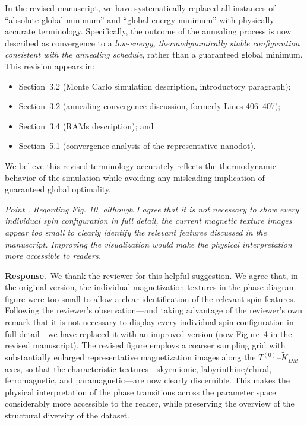 \documentclass[review,12pt]{report}
\newenvironment{reviewer}{\setcounter{pointcounter}{1}}{}
\newcommand{\point}[1]{\medskip \noindent
 \textsl{{\fontseries{b}\selectfont Point \thepointcounter}.
 \stepcounter{pointcounter} #1}}
\newcommand{\reply}{\medskip \noindent \textbf{Response}.\ }
\begin{document}
\begin{reviewer}
{In the revised manuscript, we have systematically replaced all instances of ``absolute global minimum'' and ``global energy minimum'' with physically accurate terminology. Specifically, the outcome of the annealing process is now described as convergence to a \emph{low-energy, thermodynamically stable configuration consistent with the annealing schedule}, rather than a guaranteed global minimum. This revision appears in:
\begin{itemize}
    \item Section~3.2 (Monte Carlo simulation description, introductory paragraph);
    \item Section~3.2 (annealing convergence discussion, formerly Lines 406--407);
    \item Section~3.4 (RAMs description); and
    \item Section~5.1 (convergence analysis of the representative nanodot).
\end{itemize}

We believe this revised terminology accurately reflects the thermodynamic behavior of the simulation while avoiding any misleading implication of guaranteed global optimality.}

  

\point{Regarding Fig. 10, although I agree that it is not necessary to show every individual spin configuration in full detail, the current magnetic texture images appear too small to clearly identify the relevant features discussed in the manuscript. Improving the visualization would make the physical interpretation more accessible to readers.}

\reply{We thank the reviewer for this helpful suggestion. We agree that, in the original version, the individual magnetization textures in the phase-diagram figure were too small to allow a clear identification of the relevant spin features. Following the reviewer's observation---and taking advantage of the reviewer's own remark that it is not necessary to display every individual spin configuration in full detail---we have replaced it with an improved version (now Figure~4 in the revised manuscript). The revised figure employs a coarser sampling grid with substantially enlarged representative magnetization images along the $T^{(0)}$--$\tilde{K}_{DM}$ axes, so that the characteristic textures---skyrmionic, labyrinthine/chiral, ferromagnetic, and paramagnetic---are now clearly discernible. This makes the physical interpretation of the phase transitions across the parameter space considerably more accessible to the reader, while preserving the overview of the structural diversity of the dataset.}

\end{reviewer}
 
\end{document}
